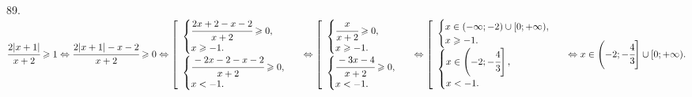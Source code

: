 89. $\cfrac{2|x+1|}{x+2}\geqslant1 \Leftrightarrow \cfrac{2|x+1|-x-2}{x+2}\geqslant0\Leftrightarrow
\left[\begin{array}{l}\begin{cases} \cfrac{2x+2-x-2}{x+2}\geqslant0,\\ x\geqslant -1.\end{cases}\\ \begin{cases}\cfrac{-2x-2-x-2}{x+2}\geqslant0,\\ x<-1.           \end{cases}\end{array}\right.\Leftrightarrow
\left[\begin{array}{l}\begin{cases} \cfrac{x}{x+2}\geqslant0,\\ x\geqslant -1.\end{cases}\\ \begin{cases}\cfrac{-3x-4}{x+2}\geqslant0,\\ x<-1.           \end{cases}\end{array}\right.\Leftrightarrow
\left[\begin{array}{l}\begin{cases} x\in(-\infty;-2)\cup[0;+\infty),\\ x\geqslant -1.\end{cases}\\ \begin{cases}x\in\left(-2;-\cfrac{4}{3}\right],\\ x<-1.\end{cases}\end{array}\right.\Leftrightarrow x\in\left(-2;-\cfrac{4}{3}\right]\cup[0;+\infty).$\\
